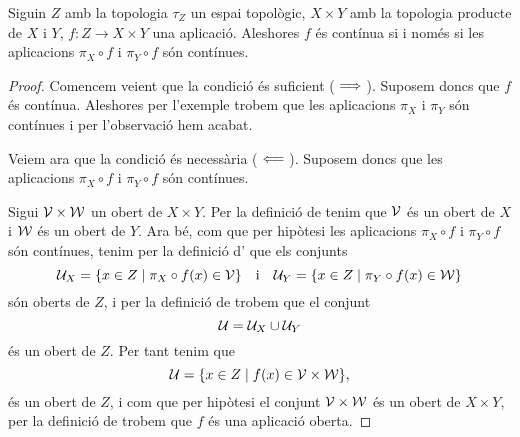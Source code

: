 \documentclass[../Apunts.tex]{subfiles}
\begin{document}
	\begin{theorem}
		\label{thm:una aplicació és contínua si i només si les seves components són contínues}
		Siguin \(Z\) amb la topologia \(\tau_{Z}\) un espai topològic, \(X\times Y\) amb la topologia producte de \(X\) i \(Y\), \(f\colon Z\longrightarrow X\times Y\) una aplicació. Aleshores \(f\) és contínua si i només si les aplicacions \(\pi_{X}\circ f\) i \(\pi_{Y}\circ f\) són contínues.
		\begin{proof}
			Comencem veient que la condició és suficient (\(\implies\)). Suposem doncs que \(f\) és contínua. Aleshores per l'exemple  trobem que les aplicacions \(\pi_{X}\) i \(\pi_{Y}\) són contínues i per l'observació  hem acabat.
			
			Veiem ara que la condició és necessària (\(\impliedby\)). Suposem doncs que les aplicacions \(\pi_{X}\circ f\) i \(\pi_{Y}\circ f\) són contínues.
			
			Sigui \(\mathcal{V}\times\mathcal{W}\) un obert de \(X\times Y\). Per la definició de  tenim que \(\mathcal{V}\) és un obert de \(X\) i \(\mathcal{W}\) és un obert de \(Y\). Ara bé, com que per hipòtesi les aplicacions \(\pi_{X}\circ f\) i \(\pi_{Y}\circ f\) són contínues, tenim per la definició d' que els conjunts
			\[\mathcal{U}_{X}=\{x\in Z\mid \pi_{X}\circ f(x)\in\mathcal{V}\}\quad\text{i}\quad
			\mathcal{U}_{Y}=\{x\in Z\mid \pi_{Y}\circ f(x)\in\mathcal{W}\}\]
			són oberts de \(Z\), i per la definició de  trobem que el conjunt
			\[\mathcal{U}=\mathcal{U}_{X}\cup\mathcal{U}_{Y}\]
			és un obert de \(Z\). Per tant tenim que
			\[\mathcal{U}=\{x\in Z\mid f(x)\in\mathcal{V}\times\mathcal{W}\},\]
			és un obert de \(Z\), i com que per hipòtesi el conjunt \(\mathcal{V}\times\mathcal{W}\) és un obert de \(X\times Y\), per la definició de  trobem que \(f\) és una aplicació oberta. %
		\end{proof}
	\end{theorem}
\end{document}
